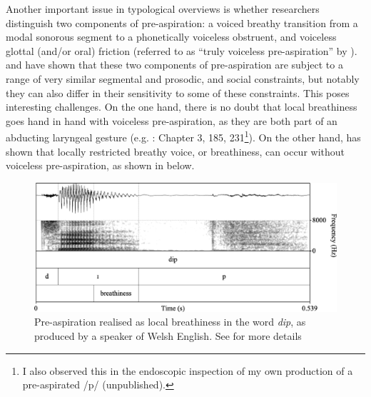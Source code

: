 \documentclass[output=paper]{langscibook}
\begin{document}
Another important issue in typological overviews is whether researchers distinguish two components of pre-aspiration: a voiced breathy transition from a modal sonorous segment to a phonetically voiceless obstruent, and voiceless glottal (and/or oral) friction (referred to as “truly voiceless pre-aspiration” by \citealt[134]{Chasaide1985}).  \textcite[e.g. 92--95, 134, 139]{Chasaide1985} and \citet[Chs. 3\&7]{Hejná2015} have shown that these two components of pre\hyp aspiration are subject to a range of very similar segmental and prosodic, and social constraints, but notably they can also differ in their sensitivity to some of these constraints. This poses interesting challenges. On the one hand, there is no doubt that local breathiness goes hand in hand with voiceless pre-aspiration, as they are both part of an abducting laryngeal gesture (e.g. \citealt{Chasaide1985}: Chapter 3, 185, 231\footnote{I also observed this in the endoscopic inspection of my own production of a pre-aspirated /p/ (unpublished).}). On the other hand, \citet{Hejná2015} has shown that locally restricted breathy voice, or breathiness, can occur without voiceless pre-aspiration, as shown in  below.

  
\begin{figure}
\includegraphics[width=\textwidth]{figures/Hejna-img004.png}
\caption{\label{fig:hejna:4} Pre-aspiration realised as local breathiness in the word \textit{dip}, as produced by a speaker of Welsh English. See \citet{Hejná2015, Hejná2016a, Hejná2016b} for more details}
\end{figure}
\end{document}
